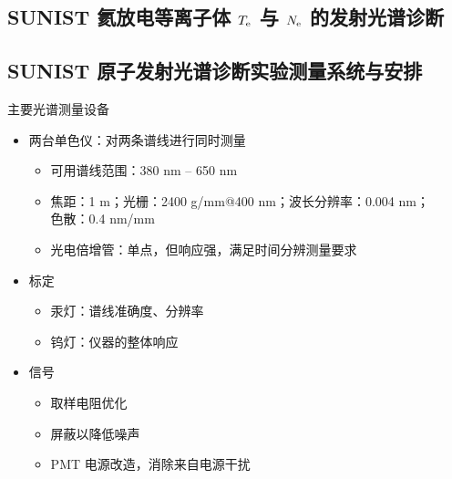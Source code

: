 \begin{CJK*}{UTF8}{kai}
\section{SUNIST 氦放电等离子体 $T_{\rm e}$ 与 $N_{\rm e}$ 的发射光谱诊断}

\subsection{SUNIST 原子发射光谱诊断实验测量系统与安排}


\begin{frame}{主要光谱测量设备}
	\begin{itemize}
		\item 两台单色仪：对两条谱线进行同时测量
			\begin{itemize}
				\item 可用谱线范围：380 nm -- 650 nm
				\item 焦距：1 m；光栅：2400 g/mm@400 nm；波长分辨率：0.004 nm；
				\\色散：0.4 nm/mm
				\item 光电倍增管：单点，但响应强，满足时间分辨测量要求
			\end{itemize}
		\bigskip
		\item 标定
			\begin{itemize}
				\item 汞灯：谱线准确度、分辨率
				\item 钨灯：仪器的整体响应
			\end{itemize}
		\bigskip
		\item 信号
			\begin{itemize}
				\item 取样电阻优化
				\item 屏蔽以降低噪声
				\item PMT 电源改造，消除来自电源干扰
			\end{itemize}
	\end{itemize}
\end{frame}


\end{CJK*}
